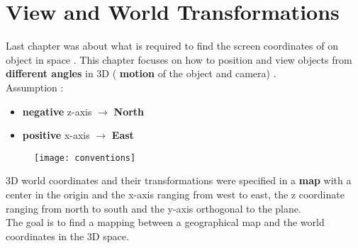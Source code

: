\newpage
\section{View and World Transformations}
Last chapter was about what is required to find the screen coordinates of on object in space . This chapter focuses on how to position and view objects from \textbf{different angles} in 3D ( \textbf{motion} of the object and camera) .\\
Assumption :
\begin{itemize}
\item \textbf{negative} z-axis $\to$ \textbf{North}
\item \textbf{positive} x-axis $\to$ \textbf{East}
\end{itemize}
\begin{figure}[H]
  \centering
  \texttt{[image: conventions]}
\end{figure}
3D world coordinates and their transformations were specified in a \textbf{map} with a center in the origin and the x-axis ranging from west to east, the
z coordinate ranging from north to south and the y-axis orthogonal to the plane.\\
The goal is to find a mapping between a geographical map and the world coordinates in the 3D space. \\

